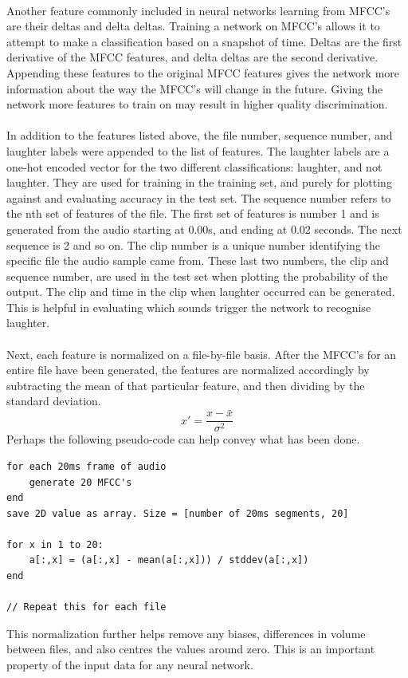 \documentclass[a4paper,11pt,notitlepage]{article}
\begin{document}
\\
Another feature commonly included in neural networks learning from MFCC's are their deltas and delta deltas. Training a network on MFCC's allows it to attempt to make a classification based on a snapshot of time. Deltas are the first derivative of the MFCC features, and delta deltas are the second derivative. Appending these features to the original MFCC features gives the network more information about the way the MFCC's will change in the future. Giving the network more features to train on may result in higher quality discrimination.\\
\\
In addition to the features listed above, the file number, sequence number, and laughter labels were appended to the list of features. The laughter labels are a one-hot encoded vector for the two different classifications: laughter, and not laughter. They are used for training in the training set, and purely for plotting against and evaluating accuracy in the test set. The sequence number refers to the nth set of features of the file. The first set of features is number 1 and is generated from the audio starting at 0.00s, and ending at 0.02 seconds. The next sequence is 2 and so on. The clip number is a unique number identifying the specific file the audio sample came from. These last two numbers, the clip and sequence number, are used in the test set when plotting the probability of the output. The clip and time in the clip when laughter occurred can be generated. This is helpful in evaluating which sounds trigger the network to recognise laughter.\\
\\
Next, each feature is normalized on a file-by-file basis. After the MFCC's for an entire file have been generated, the features are normalized accordingly by subtracting the mean of that particular feature, and then dividing by the standard deviation.
\begin{equation}
	x\prime = \frac{x - \bar{x}}{\sigma^2}
\end{equation}
Perhaps the following pseudo-code can help convey what has been done.
\begin{lstlisting}
for each 20ms frame of audio
    generate 20 MFCC's
end
save 2D value as array. Size = [number of 20ms segments, 20]

for x in 1 to 20:
    a[:,x] = (a[:,x] - mean(a[:,x])) / stddev(a[:,x])
end

// Repeat this for each file
\end{lstlisting}
This normalization further helps remove any biases, differences in volume between files, and also centres the values around zero. This is an important property of the input data for any neural network.\cite{lecun2012efficient}
\end{document}
